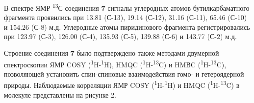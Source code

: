 \begin{multicols}{2}
В спектре ЯМР \textsuperscript{13}С соединения {\bfseries 7} сигналы
углеродных атомов бутилкарбаматного фрагмента проявились при 13.81
(С-13), 19.14 (С-12), 31.16 (С-11), 65.46 (С-10) и 154.26 (С-8) м.д.
Углеродные атомы пиридинового фрагмента регистрировались при 123.97
(С-3), 126.00 (С-4), 135.93 (С-5), 139.88 (С-6) и 143.77 (С-2) м.д.

Строение соединения {\bfseries 7} было подтверждено также методами
двумерной спектроскопии ЯМР COSY
(\textsuperscript{1}H-\textsuperscript{1}H), HMQC
(\textsuperscript{1}H-\textsuperscript{13}C) и HMВC
(\textsuperscript{1}H-\textsuperscript{13}C), позволяющей установить
спин-спиновые взаимодействия гомо- и гетероядерной природы. Наблюдаемые
корреляции ЯМР COSY (\textsuperscript{1}H-\textsuperscript{1}H) и HMQC
(\textsuperscript{1}H-\textsuperscript{13}C) в молекуле представлены на
рисунке 2.
\end{multicols}

